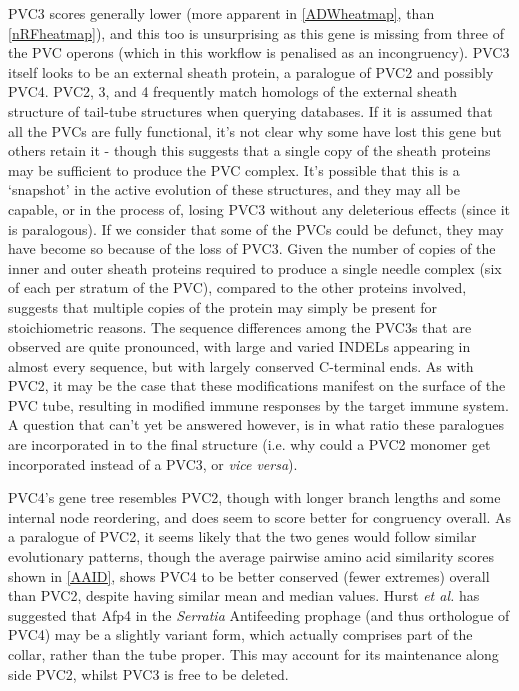 PVC3 scores generally lower (more apparent in \vref{ADWheatmap}, than \vref{nRFheatmap}), and this too is unsurprising as this gene is missing from three of the PVC operons (which in this workflow is penalised as an incongruency). PVC3 itself looks to be an external sheath protein, a paralogue of PVC2 and possibly PVC4. PVC2, 3, and 4 frequently match homologs of the external sheath structure of tail-tube structures when querying databases. If it is assumed that all the PVCs are fully functional, it's not clear why some have lost this gene but others retain it - though this suggests that a single copy of the sheath proteins may be sufficient to produce the PVC complex. It's possible that this is a `snapshot' in the active evolution of these structures, and they may all be capable, or in the process of, losing PVC3 without any deleterious effects (since it is paralogous). If we consider that some of the PVCs could be defunct, they may have become so because of the loss of PVC3. Given the number of copies of the inner and outer sheath proteins required to produce a single needle complex (six of each per stratum of the PVC), compared to the other proteins involved, suggests that multiple copies of the protein may simply be present for stoichiometric reasons. The sequence differences among the PVC3s that are observed are quite pronounced, with large and varied INDELs appearing in almost every sequence, but with largely conserved C-terminal ends. As with PVC2, it may be the case that these modifications manifest on the surface of the PVC tube, resulting in modified immune responses by the target immune system. A question that can't yet be answered however, is in what ratio these paralogues are incorporated in to the final structure (i.e. why could a PVC2 monomer get incorporated instead of a PVC3, or \emph{vice versa}).

PVC4's gene tree resembles PVC2, though with longer branch lengths and some internal node reordering, and does seem to score better for congruency overall. As a paralogue of PVC2, it seems likely that the two genes would follow similar evolutionary patterns, though the average pairwise amino acid similarity scores shown in \vref{AAID}, shows PVC4 to be better conserved (fewer extremes) overall than PVC2, despite having similar mean and median values. Hurst \emph{et al.} has suggested that Afp4 in the \emph{Serratia} Antifeeding prophage (and thus orthologue of PVC4) may be a slightly variant form, which actually comprises part of the collar, rather than the tube proper. This may account for its maintenance along side PVC2, whilst PVC3 is free to be deleted.

